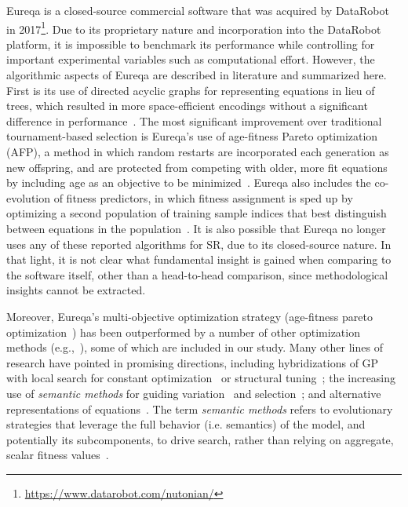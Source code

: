 Eureqa is a closed-source commercial software that was acquired by DataRobot in 2017\footnote{\url{https://www.datarobot.com/nutonian/}}. 
Due to its proprietary nature and incorporation into the DataRobot platform, it is impossible to benchmark its performance while controlling for important experimental variables such as computational effort. 
However, the algorithmic aspects of Eureqa are described in literature and summarized here. 
First is its use of directed acyclic graphs for representing equations in lieu of trees, which resulted in more space-efficient encodings without a significant difference in performance~\cite{schmidtComparisonTreeGraph2007}. 
The most significant improvement over traditional tournament-based selection is Eureqa's use of age-fitness Pareto optimization (AFP), a method in which random restarts are incorporated each generation as new offspring, and are protected from competing with older, more fit equations by including age as an objective to be minimized~\cite{schmidtAgefitnessParetoOptimization2011}. 
Eureqa also includes the co-evolution of fitness predictors, in which fitness assignment is sped up by optimizing a second population of training sample indices that best distinguish between equations in the population~\cite{schmidtCoevolutionFitnessPredictors2008}.
It is also possible that Eureqa no longer uses any of these reported algorithms for SR, due to its closed-source nature.
In that light, it is not clear what fundamental insight is gained when comparing to the software itself, other than a head-to-head comparison, since methodological insights cannot be extracted.

Moreover, Eureqa's multi-objective optimization strategy (age-fitness pareto optimization~\cite{schmidtAgefitnessParetoOptimization2011}) has been outperformed by a number of other optimization methods (e.g.,~\cite{lacavaEpsilonLexicaseSelectionRegression2016c,liskowskiDiscoverySearchObjectives2017}), some of which are included in our study.
Many other lines of research have pointed in promising directions, including hybridizations of GP with local search for constant optimization~\cite{topchyFasterGeneticProgramming2001,kommendaParameterIdentificationSymbolic2019} or structural tuning~\cite{lacavaInferenceCompactNonlinear2016}; the increasing use of \textit{semantic methods} for guiding variation~\cite{moraglioGeometricSemanticGenetic2012a,virgolinLinearScalingSemantic2019} and selection~\cite{azadKrzysztofKrawiecBehavioral2017,lacavaProbabilisticMultiobjectiveAnalysis2019,arnaldoMultipleRegressionGenetic2014a}; and alternative representations of equations~\cite{defrancaInteractionTransformationEvolutionaryAlgorithm2020,mcconaghyFFXFastScalable2011}.
The term \textit{semantic methods} refers to evolutionary strategies that leverage the full behavior (i.e. semantics) of the model, and potentially its subcomponents, to drive search, rather than relying on aggregate, scalar fitness values~\cite{vanneschiSurveySemanticMethods2014}.




